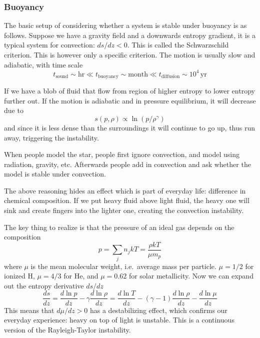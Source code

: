 \documentclass[letterpaper, 11pt]{article}
\numberwithin{equation}{section}
\numberwithin{figure}{section}
\begin{document}
\subsubsection{Buoyancy}

The basic setup of considering whether a system is stable under buoyancy is as
follows. Suppose we have a gravity field and a downwards entropy gradient, it is
a typical system for convection: $ds/dz < 0$. This is called the Schwarzschild
criterion. This is however only a specific criterion. The motion is usually slow
and adiabatic, with time scale
\begin{equation}
  \label{eq:24}
  t_\mathrm{sound} \sim \mathrm{hr} \ll t_\mathrm{buoyancy} \sim \mathrm{month} \ll t_\mathrm{diffusion} \sim 10^{4}\,\mathrm{yr}
\end{equation}

If we have a blob of fluid that flow from region of higher entropy to lower
entropy further out. If the motion is adiabatic and in pressure equilibrium, it
will decrease due to
\begin{equation}
  \label{eq:25}
  s(p, \rho) \propto \ln(p/\rho^{\gamma})
\end{equation}
and since it is less dense than the surroundings it will continue
to go up, thus run away, triggering the instability.

When people model the star, people first ignore convection, and model using
radiation, gravity, etc. Afterwards people add in convection and ask whether the
model is stable under convection.

The above reasoning hides an effect which is part of everyday life: difference
in chemical composition. If we put heavy fluid above light fluid, the heavy one
will sink and create fingers into the lighter one, creating the convection
instability.

The key thing to realize is that the pressure of an ideal gas depends on the
composition
\begin{equation}
  \label{eq:26}
  p = \sum_jn_jkT = \frac{\rho kT}{\mu m_p}
\end{equation}
where $\mu$ is the mean molecular weight, i.e.\ average mass per particle. $\mu
= 1/2$ for ionized H, $\mu = 4/3$ for He, and $\mu = 0.62$ for solar
metallicity. Now we can expand out the entropy derivative $ds/dz$
\begin{equation}
  \label{eq:27}
  \frac{ds}{dz} = \frac{d\ln p}{dz} - \gamma\frac{d\ln \rho}{dz} = \frac{d\ln T}{dz} - (\gamma - 1)\frac{d\ln \rho}{dz} - \frac{d\ln \mu}{dz}
\end{equation}
This means that $d\mu/dz > 0$ has a destabilizing effect, which confirms our
everyday experience: heavy on top of light is unstable. This is a continuous
version of the Rayleigh-Taylor instability.
\end{document}
